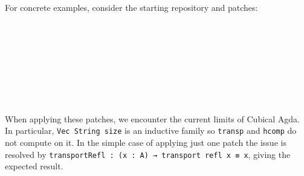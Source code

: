 For concrete examples, consider the starting repository and patches:
\begin{code}%
%
\>[2]\AgdaSpace{}%
\AgdaSymbol{:}\AgdaSpace{}%
\<%
\\
%
\>[2]\AgdaSpace{}%
\AgdaSymbol{=}\AgdaSpace{}%
\AgdaSpace{}%
\AgdaSpace{}%
\AgdaSpace{}%
\AgdaSpace{}%
\AgdaInductiveConstructor{[]}\<%
\\
%
\\[\AgdaEmptyExtraSkip]%
%
\>[2]\AgdaSpace{}%
\AgdaSpace{}%
\AgdaSpace{}%
\AgdaSpace{}%
\AgdaSymbol{:}\AgdaSpace{}%
\<%
\\
%
\>[2]\AgdaSpace{}%
\AgdaSymbol{=}\AgdaSpace{}%
\AgdaSpace{}%
\AgdaSpace{}%
\AgdaSpace{}%
\AgdaSpace{}%
\AgdaSymbol{(}\AgdaOperator{\AgdaFunction{\#}}\AgdaSpace{}%
\AgdaSymbol{)}\<%
\\
%
\>[2]\AgdaSpace{}%
\AgdaSymbol{=}\AgdaSpace{}%
\AgdaSpace{}%
\AgdaSpace{}%
\AgdaSpace{}%
\AgdaSpace{}%
\AgdaSymbol{(}\AgdaOperator{\AgdaFunction{\#}}\AgdaSpace{}%
\AgdaSymbol{)}\<%
\\
%
\>[2]\AgdaSpace{}%
\AgdaSymbol{=}\AgdaSpace{}%
\AgdaSpace{}%
\AgdaSpace{}%
\AgdaSpace{}%
\AgdaSpace{}%
\AgdaSymbol{(}\AgdaOperator{\AgdaFunction{\#}}\AgdaSpace{}%
\AgdaSymbol{)}\<%
\\
%
\>[2]\AgdaSpace{}%
\AgdaSymbol{=}\AgdaSpace{}%
\AgdaSpace{}%
\AgdaSpace{}%
\<%
\end{code}
When applying these patches, we encounter the current limits of Cubical Agda.
In particular, \texttt{Vec String size} is an inductive family so \texttt{transp} and
\texttt{hcomp} do not compute on it. In the simple case of applying just one patch the issue
is resolved by \texttt{transportRefl~:~(x~:~A)~→~transport~refl~x~≡~x}, giving the expected result.

